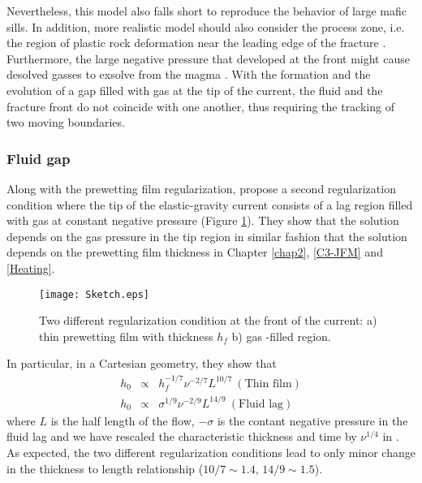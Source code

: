 Nevertheless, this model also falls short to reproduce the behavior of
large  mafic sills.   In addition,  more realistic  model should  also
consider the process zone, i.e. the region of plastic rock deformation
near       the      leading       edge      of       the      fracture
\citep{Bunger:2008cl}. Furthermore,  the large negative  pressure that
developed at the front might cause desolved gasses to exsolve from the
magma \citep{Lister:2013ia}. With the formation and the evolution of a
gap filled  with gas  at the  tip of  the current,  the fluid  and the
fracture front  do not coincide  with one another, thus  requiring the
tracking of two moving boundaries.

\subsubsection*{Fluid gap}
\label{sec:fracturation}

Along      with      the     prewetting      film      regularization,
\citet{Anonymous:QWXp_4JV} propose  a second  regularization condition
where the tip of the elastic-gravity  current consists of a lag region
filled   with    gas   at    constant   negative    pressure   (Figure
\ref{C7-Sketch}).   They show  that the  solution depends  on the  gas
pressure  in the  tip  region  in similar  fashion  that the  solution
depends  on  the prewetting  film  thickness  in Chapter  \ref{chap2},
\ref{C3-JFM} and \ref{Heating}.
\begin{figure}[h!]
  \begin{center}
    \graphicspath{ {/Users/thorey/Documents/These/Manuscript/Figure/Chapter7/} }
    \texttt{[image: Sketch.eps]}
    \caption{Two different  regularization condition  at the  front of
      the current: a) thin prewetting film with thickness $h_f$ b) gas
      -filled region.}
    \label{C7-Sketch}
  \end{center}
\end{figure}
In particular, in a Cartesian geometry, they show that
\begin{eqnarray}
  h_0&\propto& h_f^{-1/7}\nu^{-2/7}L^{10/7}~(\text{Thin film})\\
  h_0&\propto& \sigma^{1/9}\nu^{-2/9}L^{14/9}~(\text{Fluid lag})
\end{eqnarray}
where $L$  is the half  length of the  flow, $-\sigma$ is  the contant
negative  pressure  in  the  fluid   lag  and  we  have  rescaled  the
characteristic    thickness    and     time    by    $\nu^{1/4}$    in
\citet{Anonymous:QWXp_4JV}.    As   expected,    the   two   different
regularization conditions lead  to only minor change  in the thickness
to length relationship ($10/7\sim 1.4$, $14/9\sim 1.5 $).

